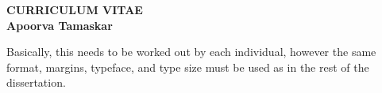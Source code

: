 
\thispagestyle{empty}

\begin{center}
{\LARGE {\bf CURRICULUM VITAE}}\\
\vspace{0.5in}
{\large {\bf Apoorva Tamaskar}}
\end{center}

Basically, this needs to be worked out by each individual, however the same format, margins, typeface, and type size must be used as in the rest of the dissertation. 
